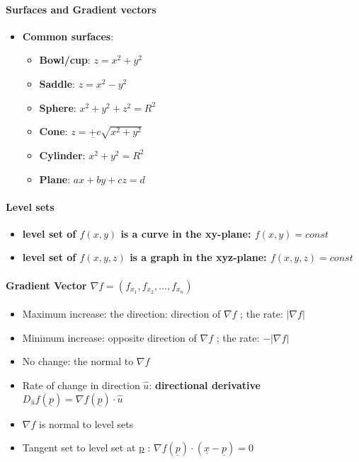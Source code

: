 \documentclass[8pt, twocolumn]{article}
\begin{document}
\paragraph{Surfaces and Gradient vectors}
	\begin{itemize}
		\item \textbf{Common surfaces}:
			\begin{itemize}
				\item \textbf{Bowl/cup}: $z = x^2 + y^2$ 
				\item \textbf{Saddle}: $z = x^2 - y^2$ 
				\item \textbf{Sphere}: $x^2 + y^2 + z^2 = R^2$ 
				\item \textbf{Cone}: $z = \underline{+} c\sqrt{x^2 + y^2}$
				\item \textbf{Cylinder}: $x^2 + y^2 = R^2$ 
				\item \textbf{Plane}: $ax + by + cz = d$
			\end{itemize}
	\end{itemize}

\paragraph{Level sets}
			\begin{itemize}
				\item \textbf{level set of $f(x, y)$ is a curve in the xy-plane: $f(x, y) = const$}
				\item \textbf{level set of $f(x, y, z)$ is a graph in the xyz-plane: $f(x, y, z) = const$}
			\end{itemize}



\paragraph{Gradient Vector $\nabla f = (f_{x_1}, f_{x_2}, ..., f_{x_n}) $}

	\begin{itemize}
			\item Maximum increase: the direction: direction of $\nabla f$ ; the rate:  $|\nabla f|$
			\item Minimum increase: opposite direction of $\nabla f$ ; the rate:  $- |\nabla f|$
			\item No change: the normal to $\nabla f$
			\item Rate of change in direction $\hat{u}$: \textbf{directional derivative} $D_{\hat{u}}f(\underline{p}) = \nabla f(\underline{p})  \cdot \hat{u}$
			\item $\nabla f$ is normal to level sets 
			\item Tangent set to level set at \underline{p} : $\nabla f(\underline{p})  \cdot (\underline{x} - \underline{p}) = 0$
	\end{itemize} 
\end{document}
